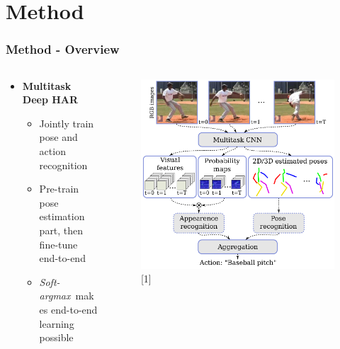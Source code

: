 \documentclass[9pt]{beamer}
\providecommand{\sourcefix}[1]{\\ \footnotesize \tugreen{Source:} [#1]}
\renewcommand{\caption}[1]{\\ \footnotesize{\captiongrey{#1}}}
\newenvironment{myframe}[1][]{%
\begin{frame}%
\frametitle{#1}
\setcounter{footnote}{0}


}{%
\end{frame}%
}
\begin{document}
\tableofcontents

\section{Method}

\begin{myframe}[Method - Overview]
	\begin{columns}[T]
        \begin{column}{.45\textwidth}
            \begin{itemize}
                \item \textbf{Multitask Deep HAR}\footnotemark
                \begin{itemize}
                    \item Jointly train pose and action recognition
                    \item Pre-train pose estimation part, then fine-tune end-to-end
                    \item \textit{Soft-argmax}\footnotemark~makes end-to-end learning possible
                \end{itemize}
            \end{itemize}
        \end{column}
        \begin{column}{.45\textwidth}
            \begin{figure}
                \includegraphics[width=.99\textwidth]{endtoend-concept.png}
                \sourcefix{1}
            \end{figure}
        \end{column}
        \end{columns}
    \end{myframe}
\end{document}
